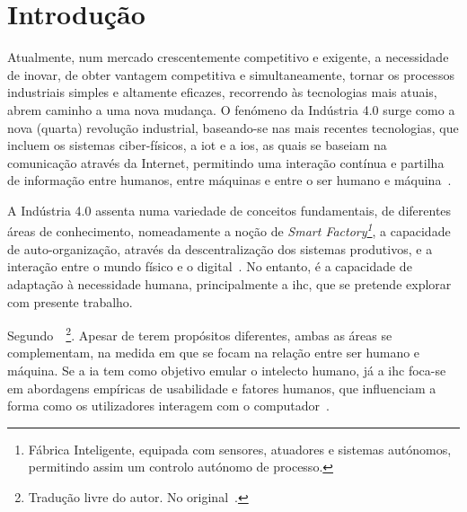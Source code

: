 \chapter{Introdução}
\label{chap:Chapter1}

Atualmente, num mercado crescentemente competitivo e exigente, a necessidade de inovar, de obter vantagem competitiva e simultaneamente, tornar os processos industriais simples e altamente eficazes, recorrendo às tecnologias mais atuais, abrem caminho a uma nova mudança. O fenómeno da Indústria 4.0 surge como a nova (quarta) revolução industrial, baseando-se nas mais recentes tecnologias, que incluem os sistemas ciber-físicos, a \gls{iot} e a \gls{ios}, as quais se baseiam na comunicação através da Internet, permitindo uma interação contínua e partilha de informação entre humanos, entre máquinas e entre o ser humano e máquina~\parencite{complex_view_industry40}. 

A Indústria 4.0 assenta numa variedade de conceitos fundamentais, de diferentes áreas de conhecimento, nomeadamente a noção de \textit{Smart Factory\footnote{Fábrica Inteligente, equipada com sensores, atuadores e sistemas autónomos, permitindo assim um controlo autónomo de processo.}}, a capacidade de auto-organização, através da descentralização dos sistemas produtivos, e a interação entre o mundo físico e o digital~\parencite[Fundamental Concepts, p.240]{industry40}. No entanto, é a capacidade de adaptação à necessidade humana, principalmente a \gls{ihc}, que se pretende explorar com presente trabalho.

Segundo~\textcite[p.1]{natural_language_translation_intersaction_ai_hci}~\footnote{Tradução livre do autor. No original~.}. Apesar de terem propósitos diferentes, ambas as áreas se complementam, na medida em que se focam na relação entre ser humano e máquina. Se a \gls{ia} tem como objetivo emular o intelecto humano, já a \gls{ihc} foca-se em abordagens empíricas de usabilidade e fatores humanos, que influenciam a forma como os utilizadores interagem com o computador~\parencite{natural_language_translation_intersaction_ai_hci}. 

